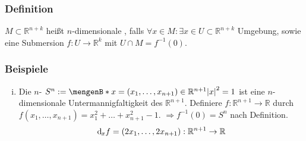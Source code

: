 \subsubsection[Definition: Untermannigfaltigkeit]{Definition} %
\label{ssub:116}
$M \subset \mathds{R}^{n+k}$ heißt $n$-dimensionale , falls $\forall x \in M : \exists x \in U \subset \mathds{R}^{n+k}$ Umgebung, sowie eine
Submersion $f : U \to \mathds{R}^k$ mit $U \cap M = f ^{-1}(0)$. 

\subsubsection[Beispiele für Untermannigfaltigkeiten]{Beispiele} %
\label{ssub:117}
\begin{enumerate}[(i)]
	\item Die $n$- $S^n := \set[x=(x_1, \ldots ,x_{n+1}) \in \mathds{R}^{n+1}]{\abs*{x}^2=1 } $ ist eine $n$-dimensionale Untermannigfaltigkeit des 
	$\mathds{R}^{n+1}$. Definiere $f : \mathds{R}^{n+1} \to \mathds{R}$ durch $f(x_1, \ldots , x_{n+1}) = x_1^2 + \ldots + x_{n+1}^2 -1$. $\Rightarrow f ^{-1}(0) = S^n$ nach
	Definition.
	\[
		\mathrm{d}\mkern-1.0mu_x f = (2 x_1, \ldots , 2 x_{n+1}) : \mathbb{R}^{n+1} \to \mathbb{R}
	\]
\end{enumerate}


\cleardoubleoddemptypage
{}
\setcounter{page}{1}
\printindex
\listoffigures

